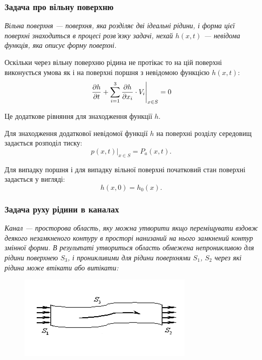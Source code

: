 \subsubsection{Задача про вільну поверхню}

\begin{definition}
	\it{Вільна поверхня} --- поверхня, яка розділяє дві ідеальні рідини, і форма цієї поверхні знаходиться в процесі розв'язку задачі, нехай $h(x, t)$ --- невідома функція, яка описує форму поверхні.
\end{definition}

Оскільки через вільну поверхню рідина не протікає то на цій поверхні виконується умова як і на поверхні поршня з невідомою функцією $h(x, t)$:
\begin{equation}
	\left. \frac{\partial h}{\partial t} + \displaystyle\sum\limits_{i = 1}^3 \frac{\partial h}{\partial x_i} \cdot V_i \right|_{x \in S} = 0
\end{equation}

Це додаткове рівняння для знаходження функції $h$. \medskip

Для знаходження додаткової невідомої функції $h$ на поверхні розділу середовищ задається розподіл тиску:
\begin{equation}
	\left. p(x, t) \right|_{x \in S} = P_a(x, t).
\end{equation}

Для випадку поршня і для випадку вільної поверхні початковий стан поверхні задається у вигляді:
\begin{equation}
	h(x, 0) = h_0(x).
\end{equation}

\subsubsection{Задача руху рідини в каналах}

\begin{definition}[каналу]
	\it{Канал} --- просторова область, яку можна утворити якщо переміщувати вздовж деякого незамкненого контуру в просторі нанизаний на нього замкнений контур змінної форми. В результаті утвориться область обмежена непроникливою для рідини поверхнею $S_3$, і проникливими для рідини поверхнями $S_1$, $S_2$ через які рідина може втікати або витікати:

	\begin{figure}[H]
		\centering
		\includegraphics[width=.5\textwidth]{img/10-2.png}
	\end{figure}
\end{definition}

